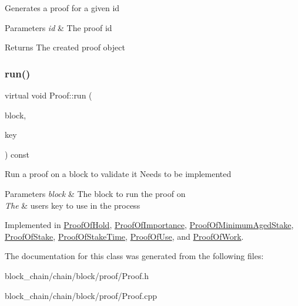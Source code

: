 Generates a proof for a given id


\begin{DoxyParams}{Parameters}
{\em id} & The proof id \\
\hline
\end{DoxyParams}
\begin{DoxyReturn}{Returns}
The created proof object 
\end{DoxyReturn}
\mbox{\label{classProof_a6ab9f6c3f603447e3a9c7c932b5deac4}} 
\subsubsection{\texorpdfstring{run()}{run()}}
{\footnotesize\ttfamily virtual void Proof\+::run (\begin{DoxyParamCaption}\item[{\mbox{\hyperlink{classBlock}{Block}} $\ast$}]{block,  }\item[{std\+::string}]{key }\end{DoxyParamCaption}) const\hspace{0.3cm}{\ttfamily [pure virtual]}}

Run a proof on a block to validate it Needs to be implemented


\begin{DoxyParams}{Parameters}
{\em block} & The block to run the proof on \\
\hline
{\em The} & user\textquotesingle{}s key to use in the process \\
\hline
\end{DoxyParams}


Implemented in \mbox{\hyperlink{classProofOfHold_a3daccb372774a6b4f6ed758be624eaf2}{Proof\+Of\+Hold}}, \mbox{\hyperlink{classProofOfImportance_a08f72d852cefc73c21bc22cbdaf956ff}{Proof\+Of\+Importance}}, \mbox{\hyperlink{classProofOfMinimumAgedStake_aab3c754b7bc7c1c1e2ccebdaa764249b}{Proof\+Of\+Minimum\+Aged\+Stake}}, \mbox{\hyperlink{classProofOfStake_ab5062d721fffffadfd9a599496d939dd}{Proof\+Of\+Stake}}, \mbox{\hyperlink{classProofOfStakeTime_a4081abb2bc76f8039995a73e9617086c}{Proof\+Of\+Stake\+Time}}, \mbox{\hyperlink{classProofOfUse_aefccdad0aa3344b6331acecc05299cc0}{Proof\+Of\+Use}}, and \mbox{\hyperlink{classProofOfWork_a31d9107577bafc58c5ce2374e79f2b3c}{Proof\+Of\+Work}}.



The documentation for this class was generated from the following files\+:\begin{DoxyCompactItemize}
\item 
block\+\_\+chain/chain/block/proof/Proof.\+h\item 
block\+\_\+chain/chain/block/proof/Proof.\+cpp\end{DoxyCompactItemize}
